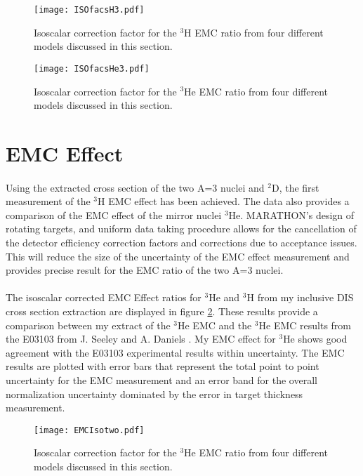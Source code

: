	\begin{figure}[h]
		\texttt{[image: ISOfacsH3.pdf]}
		\caption{Isoscalar correction factor for the $^3$H EMC ratio from four different models discussed in this section.}
		\label{isofuncs}
		\vspace{2cm}
		\texttt{[image: ISOfacsHe3.pdf]}
		\caption{Isoscalar correction factor for the $^3$He EMC ratio from four different models discussed in this section.}
		\label{isofuncsHe3}
	\end{figure}

\section{EMC Effect}
\paragraph{} Using the extracted cross section of the two A=3 nuclei and $^2$D, the first measurement of the $^3$H EMC effect has been achieved. The data also provides a comparison of the EMC effect of the mirror nuclei $^3$He. MARATHON's design of rotating targets, and uniform data taking procedure allows for the cancellation of the detector efficiency correction factors and corrections due to acceptance issues. This will reduce the size of the uncertainty of the EMC effect measurement and provides precise result for the EMC ratio of the two A=3 nuclei. 
\paragraph{}The isoscalar corrected EMC Effect ratios for $^3$He and $^3$H from my inclusive DIS cross section extraction are displayed in figure \ref{ISOEMC_B}. These results provide a comparison between my extract of the $^3$He EMC and the $^3$He EMC results from the E03103 from J. Seeley and A. Daniels \cite{seeley}. My EMC effect for $^3$He shows good agreement with the E03103 experimental results within uncertainty. The EMC results are plotted with error bars that represent the total point to point uncertainty for the EMC measurement and an error band for the overall normalization uncertainty dominated by the error in target thickness measurement.  
	\begin{figure}
		\texttt{[image: EMCIsotwo.pdf]}
		\caption{Isoscalar correction factor for the $^3$He EMC ratio from four different models discussed in this section.}
		\label{ISOEMC_B}
	\end{figure}

